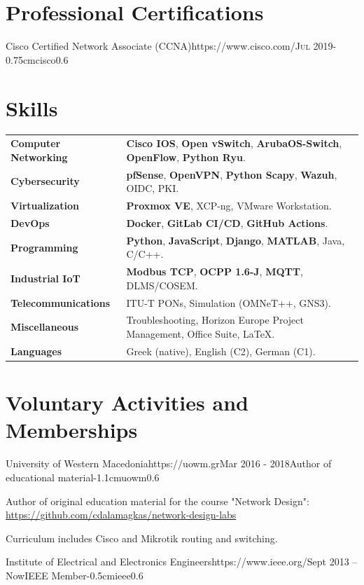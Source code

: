 \documentclass{mycv}
\begin{document}
	\section{Professional Certifications}
	\begin{EntryDatedLogo}{Cisco Certified Network Associate (CCNA)}{https://www.cisco.com/}{\scshape{Jul 2019}}{}{-0.75cm}{cisco}{0.6}
	\end{EntryDatedLogo}
	
	\section{Skills}
	\begin{tabular}{m{4.5cm} m{13cm}}\renewcommand{\arraystretch}{2}
		\textbf{Computer Networking}   	& \textbf{Cisco IOS}, \textbf{Open vSwitch}, \textbf{ArubaOS-Switch}, \textbf{OpenFlow}, \textbf{Python Ryu}.\\
		\textbf{Cybersecurity}			& \textbf{pfSense}, \textbf{OpenVPN}, \textbf{Python Scapy}, \textbf{Wazuh}, OIDC, PKI.\\
		\textbf{Virtualization}			& \textbf{Proxmox VE}, XCP-ng, VMware Workstation.\\ 
		\textbf{DevOps}					& \textbf{Docker}, \textbf{GitLab CI/CD}, \textbf{GitHub Actions}. \\
		\textbf{Programming} 	    	& \textbf{Python}, \textbf{JavaScript}, \textbf{Django}, \textbf{MATLAB}, Java, C/C++. \\
		\textbf{Industrial IoT}			& \textbf{Modbus TCP}, \textbf{OCPP 1.6-J}, \textbf{MQTT}, DLMS/COSEM.\\
		\textbf{Telecommunications}   	& ITU-T PONs, Simulation (OMNeT++, GNS3). \\
		\textbf{Miscellaneous}			& Troubleshooting, Horizon Europe Project Management, Office Suite, \LaTeX. \\
		\textbf{Languages} 				& Greek (native), English (C2), German (C1).
	\end{tabular}

	\section{Voluntary Activities and Memberships}
	\vspace*{0.125cm}	
	\begin{EntryDatedLogo}{University of Western Macedonia}{https://uowm.gr}{Mar 2016 - 2018}{Author of educational material}{-1.1cm}{uowm}{0.6}
		\begin{Itemize}
			\item Author of original education material for the course "Network Design": \url{https://github.com/cdalamagkas/network-design-labs}
			\item Curriculum includes Cisco and Mikrotik routing and switching.
		\end{Itemize}
	\end{EntryDatedLogo}

	\vspace*{0.5cm}

	\begin{EntryDatedLogo}{Institute of Electrical and Electronics Engineers}{https://www.ieee.org/}{Sept 2013 -- Now}{IEEE Member}{-0.5cm}{ieee}{0.6}
	\end{EntryDatedLogo}

\end{document}
